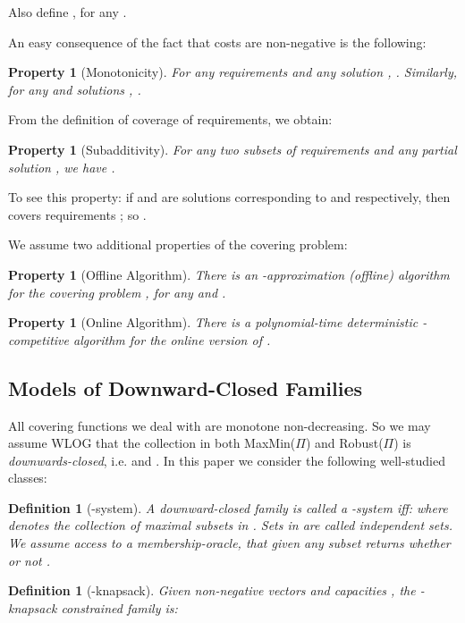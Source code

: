 \documentclass[11pt,letterpaper]{article}
\newtheorem{definition}[theorem]{Definition}
\newtheorem{property}[theorem]{Property}
\def\cov{\ensuremath{\Pi}\xspace}
\def\rcov{{\sf Robust(\cov)}\xspace}
\def\mmp{{\sf MaxMin(\cov)}\xspace}
\newcounter{note}[section]
\begin{document}
Also define , for any .

An easy consequence of the fact that costs are non-negative is the following:
\begin{property}[Monotonicity]\label{ass:monotone}
For any requirements  and any solution , . Similarly, for any
 and solutions , .
\end{property}

From the definition of coverage of requirements, we obtain:
\begin{property}[Subadditivity]\label{ass:subadd}
  For any two subsets of requirements  and any partial
  solution , we have .
\end{property}
To see this property: if  and  are solutions corresponding to  and
 respectively, then   covers requirements ; so .

We assume two additional properties of the covering problem:
\begin{property}[Offline Algorithm]\label{ass:apx}
  There is an -approximation (offline) algorithm for the
  covering problem , for any  and .
\end{property}
\begin{property}[Online Algorithm]\label{ass:online}
  There is a polynomial-time deterministic -competitive algorithm for the online
  version of .\end{property}


\subsection{Models of Downward-Closed Families}
All covering functions we deal with are monotone non-decreasing. So we
may assume WLOG that the collection  in both \mmp and \rcov is
\emph{downwards-closed}, i.e.  and  
. In this paper we consider the following well-studied
classes:

\begin{definition}[-system]\label{defn:p-system} A downward-closed family  is called a -system iff:
 where  denotes the collection of {\em maximal subsets} in
. Sets in  are called {\em independent sets}. We assume access to a membership-oracle, that given any
subset  returns whether or not .
\end{definition}

\begin{definition}[-knapsack]\label{defn:q-knapsack}
Given  non-negative vectors  and capacities , the -knapsack constrained family is:

\end{definition}
\end{document}
